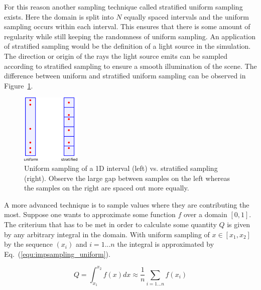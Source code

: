 \documentclass[a4paper,10pt]{article}
\newcommand{\equref}[1]{Eq.~(\ref{#1})}
\newcommand{\figref}[1]{Figure~\ref{#1}}
\begin{document}
    For this reason another sampling technique called stratified uniform
    sampling exists.
    Here the domain is split into $N$ equally spaced intervals and the
    uniform sampling occurs within each interval.
    This ensures that there is some amount of regularity while still
    keeping the randomness of uniform sampling.
    An application of stratified sampling would be the definition of
    a light source in the simulation.
    The direction or origin of the rays the light source emits can be
    sampled according to stratified sampling to ensure a smooth
    illumination of the scene.
    The difference between uniform and stratified uniform sampling can
    be observed in \figref{fig:uniform_vs_stratified}.

    \begin{center}
        \begin{figure}
            \centering    
            \includegraphics[width=0.25\textwidth]{images/stratified.png}
            \caption[Uniform vs. stratified sampling]{
                Uniform sampling of a 1D interval (left) vs. stratified sampling (right).
                Observe the large gap between samples on the left whereas
                the samples on the right are spaced out more equally.
            }
            \label{fig:uniform_vs_stratified}
        \end{figure}
    \end{center}

    A more advanced technique is to sample values where they are contributing
    the most.
    Suppose one wants to approximate some function $f$ over a domain
    $[0,1]$.
    The criterium that has to be met in order to calculate some quantity
    $Q$ is given by any arbitrary integral in the domain.
    With uniform sampling of $x \in [x_1,x_2]$ by the sequence 
    $(x_i)$ and $i = 1...n$ the integral is approximated
    by \equref{equ:impsampling_uniform}.

    \begin{equation}
        \label{equ:impsampling_uniform}
        Q = \int_{x_1}^{x_2} f(x) dx \approx \frac{1}{n} \sum_{i = 1...n} f(x_i)
    \end{equation}
\end{document}
